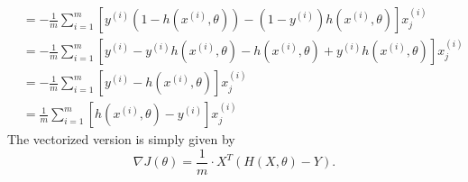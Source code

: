 \documentclass[12pt]{article}
\begin{document}
\begin{align*}
                                                           &= - \frac{1}{m}\sum_{i=1}^m \left [     y^{(i)} (1 -  h(x^{(i)}, \theta)) -                                                              (1-y^{(i)})  h(x^{(i)}, \theta) \right ] x^{(i)}_j \\
                                                           &= - \frac{1}{m}\sum_{i=1}^m \left [     y^{(i)} - y^{(i)}  h(x^{(i)}, \theta) -                                                               h(x^{(i)}, \theta) + y^{(i)}  h(x^{(i)}, \theta) \right ] x^{(i)}_j \\
                                                           &= - \frac{1}{m}\sum_{i=1}^m \left [ y^{(i)} -  h(x^{(i)}, \theta) \right ] x^{(i)}_j    \\
                                                           &= \frac{1}{m}\sum_{i=1}^m \left [  h(x^{(i)},                               \theta) - y^{(i)} \right ] x^{(i)}_j
\end{align*}
The vectorized version is simply given by
\[
  \nabla J(\theta) = \frac{1}{m} \cdot X^T \left( H(X, \theta) - Y \right).
\]
\end{document}
